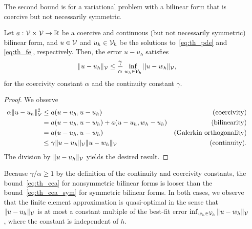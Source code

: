 The second bound is for a variational problem with a bilinear form that is coercive but not necessarily symmetric.
\begin{lemma}
  \label{lemma:th_cea_nonsym}
  Let $a: \mathcal{V} \times \mathcal{V} \to \mathbb{R}$ be a coercive and continuous (but not necessarily symmetric) bilinear form, and $u \in \mathcal{V}$ and $u_h \in \mathcal{V}_h$ be the solutions to~\eqref{eq:th_pde} and \eqref{eq:th_fe}, respectively. Then, the error $u - u_h$ satisfies
  \begin{equation}
    \| u - u_h \|_{\mathcal{V}} \leq \frac{\gamma}{\alpha} \inf_{w_h \in \mathcal{V}_h} \| u - w_h \|_{\mathcal{V}},
    \label{eq:th_cea}
  \end{equation}
  for the coercivity constant $\alpha$ and the continuity constant $\gamma$.
  \begin{proof}
    We observe
    \begin{align*}
      \alpha \| u - u_h \|^2_{\mathcal{V}}
      &\leq a(u - u_h, u - u_h) & \text{(coercivity)} \\
      &= a(u - u_h, u - w_h) + a(u - u_h, w_h - u_h) &\text{(bilinearity)} \\
      &= a(u - u_h, u - w_h) &\text{(Galerkin orthogonality)} \\
      &\leq \gamma \| u - u_h \|_{\mathcal{V}} \| u - w_h \|_{\mathcal{V}} &\text{(continuity)}.
    \end{align*}
    The division by $\| u - u_h \|_{\mathcal{V}}$ yields the desired result.
  \end{proof}
\end{lemma}
Because $\gamma/\alpha \geq 1$ by the definition of the continuity and coercivity constants, the bound~\eqref{eq:th_cea} for nonsymmetric bilinear forms is looser than the bound~\eqref{eq:th_cea_sym} for symmetric bilinear forms.  In both cases, we observe that the finite element approximation is quasi-optimal in the sense that $\| u - u_h \|_{\mathcal{V}}$ is at most a constant multiple of the best-fit error $\inf_{w_h \in \mathcal{V}_h} \| u - w_h \|_{\mathcal{V}}$, where the constant is independent of $h$.

